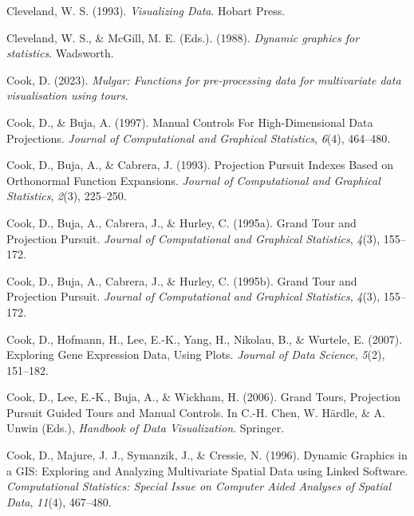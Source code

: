 \documentclass[
  letterpaper,
]{book}
\newlength{\cslhangindent}
\newlength{\cslentryspacingunit} %
\newenvironment{CSLReferences}[2] %
 {%
  \setlength{\parindent}{0pt}
  \ifodd #1
  \let\oldpar\par
  \def\par{\hangindent=\cslhangindent\oldpar}
  \fi
  \setlength{\parskip}{#2\cslentryspacingunit}
 }%
 {}
\begin{document}
\begin{CSLReferences}{1}{0}
\leavevmode{}%
Cleveland, W. S. (1993). \emph{Visualizing {D}ata}. Hobart Press.

\leavevmode{}%
Cleveland, W. S., \& McGill, M. E. (Eds.). (1988). \emph{Dynamic
graphics for statistics}. Wadsworth.

\leavevmode{}%
Cook, D. (2023). \emph{Mulgar: Functions for pre-processing data for
multivariate data visualisation using tours}.

\leavevmode{}%
Cook, D., \& Buja, A. (1997). {M}anual {C}ontrols {F}or
{H}igh-{D}imensional {D}ata {P}rojections. \emph{Journal of
Computational and Graphical Statistics}, \emph{6}(4), 464--480.

\leavevmode{}%
Cook, D., Buja, A., \& Cabrera, J. (1993). {P}rojection {P}ursuit
{I}ndexes {B}ased on {O}rthonormal {F}unction {E}xpansions.
\emph{Journal of Computational and Graphical Statistics}, \emph{2}(3),
225--250.

\leavevmode{}%
Cook, D., Buja, A., Cabrera, J., \& Hurley, C. (1995a). Grand {T}our and
{P}rojection {P}ursuit. \emph{Journal of Computational and Graphical
Statistics}, \emph{4}(3), 155--172.

\leavevmode{}%
Cook, D., Buja, A., Cabrera, J., \& Hurley, C. (1995b). Grand {T}our and
{P}rojection {P}ursuit. \emph{Journal of Computational and Graphical
Statistics}, \emph{4}(3), 155--172.

\leavevmode{}%
Cook, D., Hofmann, H., Lee, E.-K., Yang, H., Nikolau, B., \& Wurtele, E.
(2007). Exploring {G}ene {E}xpression {D}ata, {U}sing {P}lots.
\emph{Journal of Data Science}, \emph{5}(2), 151--182.

\leavevmode{}%
Cook, D., Lee, E.-K., Buja, A., \& Wickham, H. (2006). {G}rand {T}ours,
{P}rojection {P}ursuit {G}uided {T}ours and {M}anual {C}ontrols. In
C.-H. Chen, W. Härdle, \& A. Unwin (Eds.), \emph{Handbook of {D}ata
{V}isualization}. Springer.

\leavevmode{}%
Cook, D., Majure, J. J., Symanzik, J., \& Cressie, N. (1996). {D}ynamic
{G}raphics in a {GIS}: {E}xploring and {A}nalyzing {M}ultivariate
{S}patial {D}ata using {L}inked {S}oftware. \emph{Computational
Statistics: Special Issue on Computer Aided Analyses of Spatial Data},
\emph{11}(4), 467--480.


\end{CSLReferences}
\end{document}

